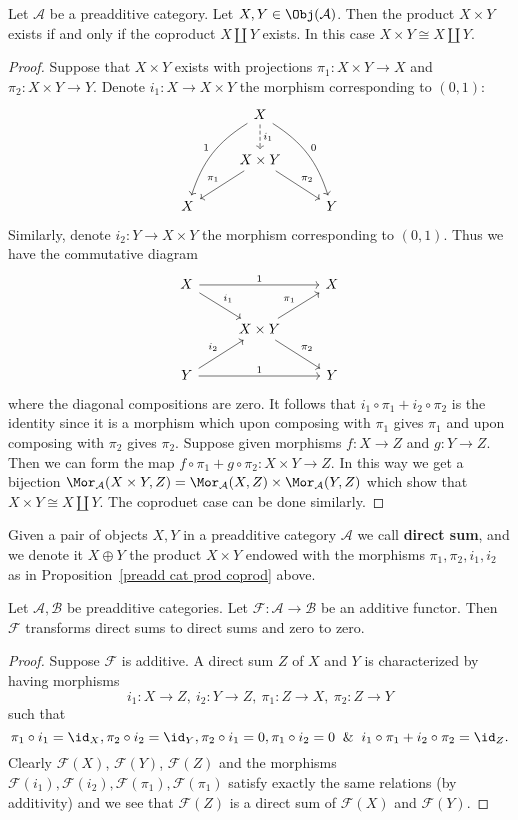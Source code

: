 \begin{proposition}\label{preadd cat prod coprod}
Let $\mathcal{A}$ be a preadditive category. Let $X,Y\in\Obj(\mathcal{A})$. Then the product $X\times Y$ exists if and only if the coproduct $X\amalg Y$ exists. In this case $X\times Y\cong X\amalg Y$.
\end{proposition}
\begin{proof}
Suppose that $X\times Y$ exists with projections $\pi_1:X\times Y\to X$ and $\pi_2:X\times Y\to Y$. Denote $i_1:X\to X\times Y$ the morphism corresponding to $(0,1)$:
\[\begin{tikzcd}
&X\ar[ldd,bend right=20pt,swap,"1"]\ar[d,dashed,"i_1"]\ar[rdd,bend left=20pt,"0"]&\\
&X\times Y\ar[ld,swap,"\pi_1"]\ar[rd,"\pi_2"]&\\
X&&Y
\end{tikzcd}\]
Similarly, denote $i_2:Y\to X\times Y$ the morphism corresponding to $(0,1)$. Thus we have the commutative diagram
\[\begin{tikzcd}
X\ar[rr,"1"]\ar[rd,"i_1"]&&X\\
&X\times Y\ar[ru,"\pi_1"]\ar[rd,"\pi_2"]&\\
Y\ar[rr,"1"]\ar[ru,"i_2"]&&Y
\end{tikzcd}\]
where the diagonal compositions are zero. It follows that $i_1\circ \pi_1+i_2\circ\pi_2$ is the identity since it is a morphism which upon composing with $\pi_1$ gives $\pi_1$ and upon composing with $\pi_2$ gives $\pi_2$. Suppose given morphisms $f:X\to Z$ and $g:Y\to Z$. Then we can form the map $f\circ\pi_1+g\circ\pi_2:X\times Y\to Z$. In this way we get a bijection $\Mor_{\mathcal{A}}(X\times Y,Z)=\Mor_{\mathcal{A}}(X,Z)\times\Mor_{\mathcal{A}}(Y,Z)$ which show that $X\times Y\cong X\amalg Y$. The coproduet case can be done similarly.
\end{proof}

\begin{definition}
Given a pair of objects $X,Y$ in a preadditive category $\mathcal{A}$ we call \textbf{direct sum}, and we denote it $X\oplus Y$ the product $X\times Y$ endowed with the morphisms $\pi_1,\pi_2,i_1,i_2$ as in Proposition~\ref{preadd cat prod coprod} above.
\end{definition}
\begin{proposition}
Let $\mathcal{A},\mathcal{B}$ be preadditive categories. Let $\mathscr{F}:\mathcal{A}\to\mathcal{B}$ be an additive functor. Then $\mathscr{F}$ transforms direct sums to direct sums and zero to zero.
\end{proposition}
\begin{proof}
Suppose $\mathscr{F}$ is additive. A direct sum $Z$ of $X$ and $Y$ is characterized by having morphisms 
\[i_1:X\to Z,\ i_2:Y\to Z,\ \pi_1:Z\to X,\ \pi_2:Z\to Y\]
such that
\[\pi_1\circ i_1=\id_X,\pi_2\circ i_2=\id_Y,\pi_2\circ i_1=0,\pi_1\circ i_2=0\And i_1\circ\pi_1+i_2\circ\pi_2=\id_Z.\]
Clearly $\mathscr{F}(X)$, $\mathscr{F}(Y)$, $\mathscr{F}(Z)$ and the morphisms $\mathscr{F}(i_1),\mathscr{F}(i_2),\mathscr{F}(\pi_1),\mathscr{F}(\pi_1)$ satisfy exactly the same relations (by additivity) and we see that $\mathscr{F}(Z)$ is a direct sum of $\mathscr{F}(X)$ and $\mathscr{F}(Y)$.
\end{proof}
